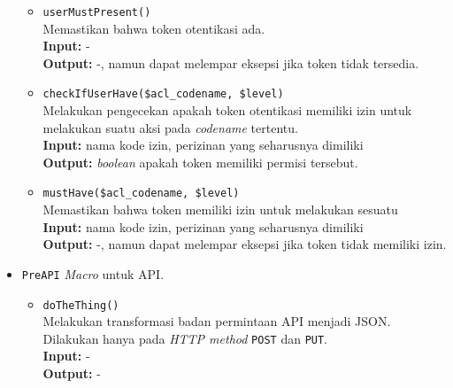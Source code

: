 \begin{itemize}
\begin{itemize}
                \item \texttt{userMustPresent()} \\
                    Memastikan bahwa token otentikasi ada. \\
                    \textbf{Input:} -\\
                    \textbf{Output:} -, namun dapat melempar eksepsi jika token
                    tidak tersedia.
                    
                \item \texttt{checkIfUserHave(\$acl\_codename, \$level)} \\
                    Melakukan pengecekan apakah token otentikasi memiliki izin
                    untuk melakukan suatu aksi pada \textit{codename}
                    tertentu.\\
                    \textbf{Input:} nama kode izin, perizinan yang seharusnya
                    dimiliki\\
                    \textbf{Output:} \textit{boolean} apakah token memiliki
                    permisi tersebut.
                    
                \item \texttt{mustHave(\$acl\_codename, \$level)} \\
                    Memastikan bahwa token memiliki izin untuk melakukan sesuatu
                    \\
                    \textbf{Input:} nama kode izin, perizinan yang seharusnya
                    dimiliki\\
                    \textbf{Output:} -, namun dapat melempar eksepsi jika token
                    tidak memiliki izin.
            \end{itemize}
            
        \item \texttt{PreAPI} \textit{Macro} untuk API.
            \begin{itemize}
                \item \texttt{doTheThing()} \\
                    Melakukan transformasi badan permintaan API menjadi JSON.
                    Dilakukan hanya pada \textit{HTTP method} \texttt{POST} dan
                    \texttt{PUT}.\\
                    \textbf{Input:} -\\
                    \textbf{Output:} -
            \end{itemize}
        

\end{itemize}
